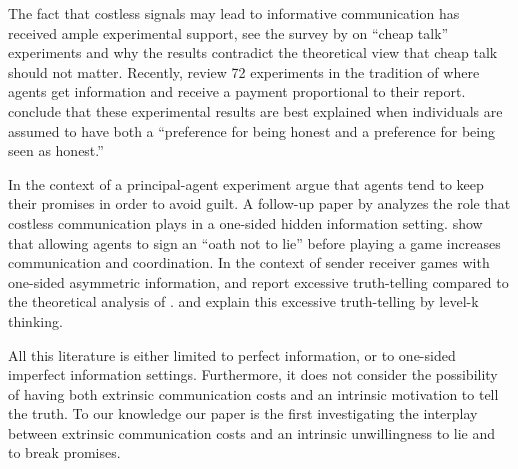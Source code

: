 \documentclass[12pt]{article}
\theoremstyle{break}
\begin{document}

The fact that costless signals may lead to informative communication has received ample experimental support, see the survey by \cite{crawford1998} on ``cheap talk'' experiments and why the results contradict the theoretical view that cheap talk should not matter. Recently, \cite{abeler2019} review 72 experiments in the tradition of \cite{fischbacher2013} where agents get information and receive a payment proportional to their report. \cite{abeler2019} conclude that these experimental results are  best explained when individuals are assumed to have both a ``preference for being honest and a preference for being seen as honest.'' 

In the context of a principal-agent experiment \cite{charness2006} argue that agents tend to keep their promises in order to avoid guilt. A follow-up paper by \cite{charness2011} analyzes the role that costless communication plays in a one-sided hidden information setting. \cite{jacquemet2018} show that allowing agents to sign an ``oath not to lie'' before playing a game increases communication and coordination. In the context of sender receiver games with one-sided asymmetric information, \cite{cai2006} and \cite{Wang2010} report excessive truth-telling compared to the theoretical analysis of \cite{Crawford1982}. \cite{Wang2010} and \cite{Crawford2013} explain this excessive truth-telling by level-k thinking.  





All this literature is either limited to perfect information, or to one-sided imperfect information settings. Furthermore, it does not consider the possibility of having both extrinsic communication costs and an intrinsic motivation to tell the truth. To our knowledge our paper is the first investigating the interplay between extrinsic communication costs and an intrinsic unwillingness to lie and to break promises.
\end{document}
